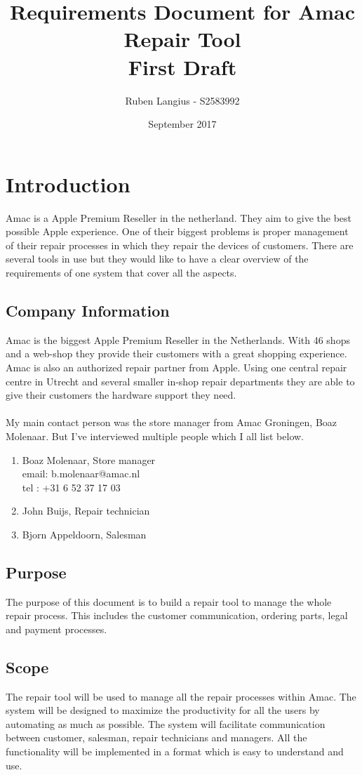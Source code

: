 \documentclass{article}
\title{Requirements Document for Amac Repair Tool\\ First Draft}
\author{Ruben Langius - S2583992}
\date{September 2017}
\begin{document}
\maketitle

\section{Introduction}
Amac is a Apple Premium Reseller in the netherland. They aim to give the best possible Apple experience. One of their biggest problems is proper management of their repair processes in which they repair the devices of customers. There are several tools in use but they would like to have a clear overview of the requirements of one system that cover all the aspects.

\subsection{Company Information}
Amac is the biggest Apple Premium Reseller in the Netherlands. With 46 shops and a web-shop they provide their customers with a great shopping experience. Amac is also an authorized repair partner from Apple. Using one central repair centre in Utrecht and several smaller in-shop repair departments they are able to give their customers the hardware support they need.\\
\\
My main contact person was the store manager from Amac Groningen, Boaz Molenaar. But I've interviewed multiple people which I all list below. 

\begin{enumerate}
\item Boaz Molenaar, Store manager \\
email: b.molenaar@amac.nl\\
tel : +31 6 52 37 17 03
\item John Buijs, Repair technician 
\item Bjorn Appeldoorn, Salesman
\end{enumerate}


\subsection{Purpose}
The purpose of this document is to build a repair tool to manage the whole repair process. This includes the customer communication, ordering parts, legal and payment processes. 

\subsection{Scope}
The repair tool will be used to manage all the repair processes within Amac. The system will be designed to maximize the productivity for all the users by automating as much as possible. The system will facilitate communication between customer, salesman, repair technicians and managers. All the functionality will be implemented in a format which is easy to understand and use.
\end{document}
